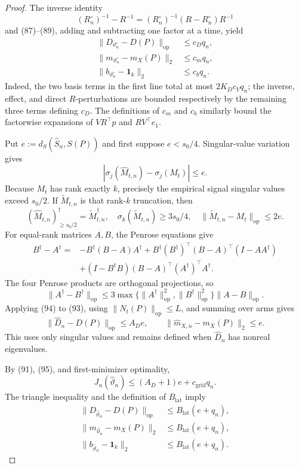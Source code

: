 \documentclass{article}
\begin{document}
\begin{proof}
The inverse identity
\[
(R_n^\circ)^{-1}-R^{-1}=(R_n^\circ)^{-1}(R-R_n^\circ)R^{-1}          \tag{90}
\]
and (87)--(89), adding and subtracting one factor at a time, yield
\[
\begin{aligned}
\lVert D_{\vartheta_n^\circ}-D(P)\rVert_{\mathrm{op}}&\le c_Dq_n,\\
\lVert m_{\vartheta_n^\circ}-m_X(P)\rVert_2&\le c_mq_n,\\
\lVert b_{\vartheta_n^\circ}-\mathbf1_k\rVert_2&\le c_bq_n.
\end{aligned}                                                        \tag{91}
\]
Indeed, the two basis terms in the first line total at most \(2K_Dc_Vq_n\); the inverse, effect, and direct \(R\)-perturbations are bounded respectively by the remaining three terms defining \(c_D\).  The definitions of \(c_m\) and \(c_b\) similarly bound the factorwise expansions of \(VR^\top p\) and \(RV^\top e_1\).

Put \(e:=d_S(\widehat S_n,S(P))\) and first suppose \(e<s_0/4\).  Singular-value variation gives
\[
|\sigma_j(\widehat M_{t,n})-\sigma_j(M_t)|\le e.                     \tag{92}
\]
Because \(M_t\) has rank exactly \(k\), precisely the empirical signal singular values exceed \(s_0/2\).  If \(\widetilde M_{t,n}\) is that rank-\(k\) truncation, then
\[
(\widehat M_{t,n})^\dagger_{\ge s_0/2}=\widetilde M_{t,n}^\dagger,
\quad \sigma_k(\widetilde M_{t,n})\ge3s_0/4,
\quad \lVert\widetilde M_{t,n}-M_t\rVert_{\mathrm{op}}\le2e.       \tag{93}
\]
For equal-rank matrices \(A,B\), the Penrose equations give
\[
\begin{aligned}
B^\dagger-A^\dagger={}&-B^\dagger(B-A)A^\dagger
+B^\dagger(B^\dagger)^\top(B-A)^\top(I-AA^\dagger)\\
&+(I-B^\dagger B)(B-A)^\top(A^\dagger)^\top A^\dagger.
\end{aligned}
\]
The four Penrose products are orthogonal projections, so
\[
\lVert A^\dagger-B^\dagger\rVert_{\mathrm{op}}
\le3\max\{\lVert A^\dagger\rVert_{\mathrm{op}}^2,
\lVert B^\dagger\rVert_{\mathrm{op}}^2\}
\lVert A-B\rVert_{\mathrm{op}}.                                    \tag{94}
\]
Applying (94) to (93), using \(\lVert N_t(P)\rVert_{\mathrm{op}}\le L\), and summing over arms gives
\[
\lVert\widehat D_n-D(P)\rVert_{\mathrm{op}}\le A_De,
\qquad
\lVert\widehat m_{X,n}-m_X(P)\rVert_2\le e.                         \tag{95}
\]
This uses only singular values and remains defined when \(\widehat D_n\) has nonreal eigenvalues.

By (91), (95), and first-minimizer optimality,
\[
J_n(\widehat\vartheta_n)\le(A_D+1)e+c_{\mathrm{grid}}q_n.             \tag{96}
\]
The triangle inequality and the definition of \(B_{\mathrm{lat}}\) imply
\[
\begin{aligned}
\lVert D_{\widehat\vartheta_n}-D(P)\rVert_{\mathrm{op}}&\le B_{\mathrm{lat}}(e+q_n),\\
\lVert m_{\widehat\vartheta_n}-m_X(P)\rVert_2&\le B_{\mathrm{lat}}(e+q_n),\\
\lVert b_{\widehat\vartheta_n}-\mathbf1_k\rVert_2&\le B_{\mathrm{lat}}(e+q_n).
\end{aligned}                                                        \tag{97}
\]


\end{proof}
\end{document}
